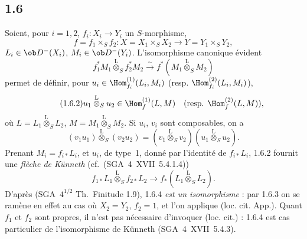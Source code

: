 \subsection*{1.6}
Soient, pour $i=1,2$, $f_i:X_i\to Y_i$ un $S$-morphisme,
\[
f=f_1\times_S f_2:X=X_1\times_S X_2\to Y=Y_1\times_S Y_2,
\]
$L_i\in\ob D^{-}(X_i)$, $M_i\in\ob D^{-}(Y_i)$. L'isomorphisme canonique évident
\begin{equation}\tag{1.6.1}
f_1^{*}M_1\overset{\mathrm{L}}{\otimes}_{S}f_2^{*}M_2\xrightarrow{\sim}f^{*}(M_1\overset{\mathrm{L}}{\otimes}_{S}M_2)
\end{equation}
permet de définir, pour $u_i\in\Hom_{f_i}^{(1)}(L_i,M_i)$ (resp. $\Hom_{f_i}^{(2)}(L_i,M_i)$),
\begin{equation}\tag{1.6.2}
u_1\overset{\mathrm{L}}{\otimes}_{S}u_2\in\Hom_{f}^{(1)}(L,M)\quad(\text{resp. }\Hom_f^{(2)}(L,M)),
\end{equation}
où $L=L_1\overset{\mathrm{L}}{\otimes}_{S}L_2$, $M=M_1\overset{\mathrm{L}}{\otimes}_{S}M_2$. Si $u_i$, $v_i$ sont composables, on a
\begin{equation}\tag{1.6.3}
(v_1u_1)\overset{\mathrm{L}}{\otimes}_{S}(v_2u_2)=(v_1\overset{\mathrm{L}}{\otimes}_{S}v_2)(u_1\overset{\mathrm{L}}{\otimes}_{S}u_2).
\end{equation}
Prenant $M_i=f_{i*}L_i$, et $u_i$, de type~1, donné par l'identité de $f_{i*}L_i$, 1.6.2 fournit une \emph{flèche de Künneth} (cf.~(SGA~4~XVII~5.4.1.4))
\begin{equation}\tag{1.6.4}
f_{1*}L_1\overset{\mathrm{L}}{\otimes}_{S}f_{2*}L_2\longrightarrow f_{*}(L_1\overset{\mathrm{L}}{\otimes}_{S}L_2).
\end{equation}
D'après (SGA~$4^{1/2}$ Th.~Finitude 1.9), 1.6.4 \emph{est un isomorphisme} : par 1.6.3 on se ramène en effet au cas où $X_2=Y_2$, $f_2=1$, et l'on applique (loc. cit. App.). Quant $f_1$ et $f_2$ sont propres, il n'est pas nécessaire d'invoquer (loc. cit.) : 1.6.4 est cas particulier de l'isomorphisme de Künneth (SGA~4~XVII~5.4.3).

